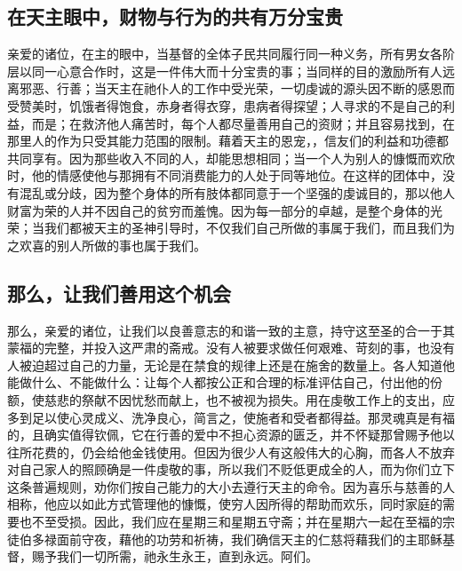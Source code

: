
\subsection{在天主眼中，财物与行为的共有万分宝贵}

亲爱的诸位，在主的眼中，当基督的全体子民共同履行同一种义务，所有男女各阶层以同一心意合作时，这是一件伟大而十分宝贵的事；当同样的目的激励所有人远离邪恶、行善；当天主在祂仆人的工作中受光荣，一切虔诚的源头因不断的感恩而受赞美时，饥饿者得饱食，赤身者得衣穿，患病者得探望；人寻求的不是自己的利益，而是；在救济他人痛苦时，每个人都尽量善用自己的资财；并且容易找到，在那里人的作为只受其能力范围的限制。藉着天主的恩宠，，信友们的利益和功德都共同享有。因为那些收入不同的人，却能思想相同；当一个人为别人的慷慨而欢欣时，他的情感使他与那拥有不同消费能力的人处于同等地位。在这样的团体中，没有混乱或分歧，因为整个身体的所有肢体都同意于一个坚强的虔诚目的，那以他人财富为荣的人并不因自己的贫穷而羞愧。因为每一部分的卓越，是整个身体的光荣；当我们都被天主的圣神引导时，不仅我们自己所做的事属于我们，而且我们为之欢喜的别人所做的事也属于我们。\par


\subsection{那么，让我们善用这个机会}

那么，亲爱的诸位，让我们以良善意志的和谐一致的主意，持守这至圣的合一于其蒙福的完整，并投入这严肃的斋戒。没有人被要求做任何艰难、苛刻的事，也没有人被迫超过自己的力量，无论是在禁食的规律上还是在施舍的数量上。各人知道他能做什么、不能做什么：让每个人都按公正和合理的标准评估自己，付出他的份额，使慈悲的祭献不因忧愁而献上，也不被视为损失。用在虔敬工作上的支出，应多到足以使心灵成义、洗净良心，简言之，使施者和受者都得益。那灵魂真是有福的，且确实值得钦佩，它在行善的爱中不担心资源的匮乏，并不怀疑那曾赐予他以往所花费的，仍会给他金钱使用。但因为很少人有这般伟大的心胸，而各人不放弃对自己家人的照顾确是一件虔敬的事，所以我们不贬低更成全的人，而为你们立下这条普遍规则，劝你们按自己能力的大小去遵行天主的命令。因为喜乐与慈善的人相称，他应以如此方式管理他的慷慨，使穷人因所得的帮助而欢乐，同时家庭的需要也不至受损。因此，我们应在星期三和星期五守斋；并在星期六一起在至福的宗徒伯多禄面前守夜，藉他的功劳和祈祷，我们确信天主的仁慈将藉我们的主耶稣基督，赐予我们一切所需，祂永生永王，直到永远。阿们。\par

